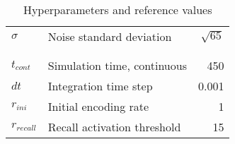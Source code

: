 \begin{table}
\begin{center}
\begin{tabular}{l l r}
        \(\sigma\) & Noise standard deviation & \(\sqrt{65}\) \\
        \\
        \\
        \(t_{cont}\) & Simulation time, continuous & 450 \\
        \(dt\) & Integration time step & 0.001 \\
        \(r_{ini}\) & Initial encoding rate & 1 \\
        \(r_{recall}\) & Recall activation threshold & 15
    \end{tabular}
    \caption{Hyperparameters and reference values}
    \label{table:hyperparameters}
\end{center}
\end{table}
